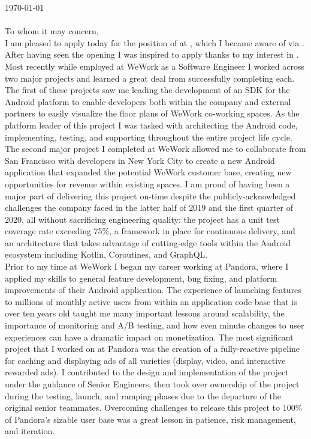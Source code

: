 \noindent\today
\\

\noindent\companyHeader
\\

\noindent To whom it may concern, \\

\noindent I am pleased to apply today for the position of \role \space at \company, which I became aware of via . After having seen the opening I was inspired to apply thanks to my interest in \interest. \extraDetail\\

\noindent Most recently while employed at WeWork as a Software Engineer I worked across two major projects and learned a great deal from successfully completing each. The first of these projects saw me leading the development of an SDK for the Android platform to enable developers both within the company and external partners to easily visualize the floor plans of WeWork co-working spaces. As the platform leader of this project I was tasked with architecting the Android code, implementing, testing, and supporting throughout the entire project life cycle. The second major project I completed at WeWork allowed me to collaborate from San Francisco with developers in New York City to create a new Android application that expanded the potential WeWork customer base, creating new opportunities for revenue within existing spaces.  I am proud of having been a major part of delivering this project on-time despite the publicly-acknowledged challenges the company faced in the latter half of 2019 and the first quarter of 2020, all without sacrificing engineering quality: the project has a unit test coverage rate exceeding 75\%, a framework in place for continuous delivery, and an architecture that takes advantage of cutting-edge tools within the Android ecosystem including Kotlin, Coroutines, and GraphQL.\\

\noindent Prior to my time at WeWork I began my career working at Pandora, where I applied my skills to general feature development, bug fixing, and platform improvements of their Android application. The experience of launching features to millions of monthly active users from within an application code base that is over ten years old taught me many important lessons around scalability, the importance of monitoring and A/B testing, and how even minute changes to user experiences can have a dramatic impact on monetization. The most significant project that I worked on at Pandora was the creation of a fully-reactive pipeline for caching and displaying ads of all varieties (display, video, and interactive rewarded ads). I contributed to the design and implementation of the project under the guidance of Senior Engineers, then took over ownership of the project during the testing, launch, and ramping phases due to the departure of the original senior teammates. Overcoming challenges to release this project to 100\% of Pandora's sizable user base was a great lesson in patience, risk management, and iteration.\\

